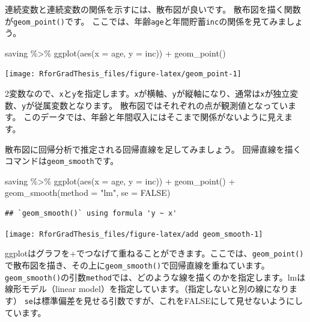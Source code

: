 \documentclass[
]{book}
\newenvironment{Shaded}{\begin{snugshade}}{\end{snugshade}}
\newcommand{\AttributeTok}[1]{\textcolor[rgb]{0.77,0.63,0.00}{#1}}
\newcommand{\ConstantTok}[1]{\textcolor[rgb]{0.00,0.00,0.00}{#1}}
\newcommand{\FunctionTok}[1]{\textcolor[rgb]{0.00,0.00,0.00}{#1}}
\newcommand{\NormalTok}[1]{#1}
\newcommand{\SpecialCharTok}[1]{\textcolor[rgb]{0.00,0.00,0.00}{#1}}
\newcommand{\StringTok}[1]{\textcolor[rgb]{0.31,0.60,0.02}{#1}}
\begin{document}
連続変数と連続変数の関係を示すには、散布図が良いです。
散布図を描く関数が\texttt{geom\_point()}です。
ここでは、年齢\texttt{age}と年間貯蓄\texttt{inc}の関係を見てみましょう。

\begin{Shaded}
\begin{Highlighting}[]
\NormalTok{saving }\SpecialCharTok{\%\textgreater{}\%}
  \FunctionTok{ggplot}\NormalTok{(}\FunctionTok{aes}\NormalTok{(}\AttributeTok{x =}\NormalTok{ age, }\AttributeTok{y =}\NormalTok{ inc)) }\SpecialCharTok{+}
  \FunctionTok{geom\_point}\NormalTok{()}
\end{Highlighting}
\end{Shaded}

\begin{center}\texttt{[image: RforGradThesis\_files/figure-latex/geom\_point-1]} \end{center}

2変数なので、\texttt{x}と\texttt{y}を指定します。\texttt{x}が横軸、\texttt{y}が縦軸になり、通常は\texttt{x}が独立変数、\texttt{y}が従属変数となります。
散布図ではそれぞれの点が観測値となっています。
このデータでは、年齢と年間収入にはそこまで関係がないように見えます。

散布図に回帰分析で推定される回帰直線を足してみましょう。
回帰直線を描くコマンドは\texttt{geom\_smooth}です。

\begin{Shaded}
\begin{Highlighting}[]
\NormalTok{saving }\SpecialCharTok{\%\textgreater{}\%}
  \FunctionTok{ggplot}\NormalTok{(}\FunctionTok{aes}\NormalTok{(}\AttributeTok{x =}\NormalTok{ age, }\AttributeTok{y =}\NormalTok{ inc)) }\SpecialCharTok{+}
  \FunctionTok{geom\_point}\NormalTok{() }\SpecialCharTok{+}
  \FunctionTok{geom\_smooth}\NormalTok{(}\AttributeTok{method =} \StringTok{"lm"}\NormalTok{, }\AttributeTok{se =} \ConstantTok{FALSE}\NormalTok{)}
\end{Highlighting}
\end{Shaded}

\begin{verbatim}
## `geom_smooth()` using formula 'y ~ x'
\end{verbatim}

\begin{center}\texttt{[image: RforGradThesis\_files/figure-latex/add geom\_smooth-1]} \end{center}

ggplotはグラフを+でつなげて重ねることができます。ここでは、\texttt{geom\_point()}で散布図を描き、その上に\texttt{geom\_smooth()}で回帰直線を重ねています。
\texttt{geom\_smooth()}の引数\texttt{method}では、どのような線を描くのかを指定します。lmは線形モデル（linear model）を指定しています。（指定しないと別の線になります）
\texttt{se}は標準偏差を見せる引数ですが、これをFALSEにして見せないようにしています。
\end{document}
